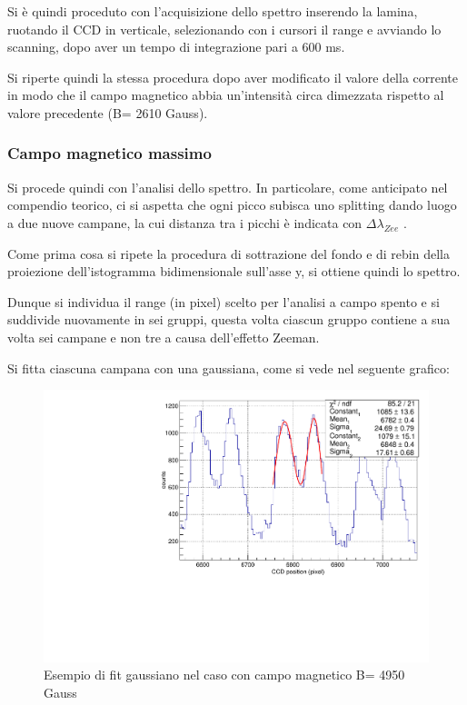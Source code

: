 \documentclass{article}
\begin{document}
	Si è quindi proceduto con l'acquisizione dello spettro inserendo la lamina, ruotando il CCD in verticale, selezionando con i cursori il range e avviando lo scanning, dopo aver un tempo di integrazione pari a 600 ms.
	
	Si riperte quindi  la stessa procedura dopo aver modificato il valore della corrente in modo che il campo magnetico abbia un'intensità circa dimezzata rispetto al valore precedente (B= 2610 Gauss).
	
	\subsubsection*{Campo magnetico massimo}
	Si procede quindi con l'analisi dello spettro.
	In particolare, come anticipato nel compendio teorico, ci si aspetta che ogni picco subisca uno splitting dando luogo a due nuove campane, la cui distanza tra i picchi è indicata con $\Delta \lambda_{Zee} $ .
	 
	 Come prima cosa si ripete la procedura di sottrazione del fondo e di rebin della proiezione dell'istogramma bidimensionale sull'asse y, si ottiene quindi lo spettro.
	 
	Dunque si individua il range (in pixel) scelto per l'analisi a campo spento e si suddivide nuovamente in sei gruppi, questa volta ciascun gruppo contiene a sua volta sei campane e non tre a causa dell'effetto Zeeman.
	
	Si fitta ciascuna campana con una gaussiana, come si vede nel seguente grafico:
	
	\begin{center}
		\begin{figure}[H]
			\centering
			\includegraphics[scale=0.38, angle=0]{campomax/singolo.pdf}
			\caption{ Esempio di fit gaussiano nel caso con campo magnetico B= 4950 Gauss}
			\label{fig:singoloBonMax}
		\end{figure}
	\end{center}
	 
\end{document}
